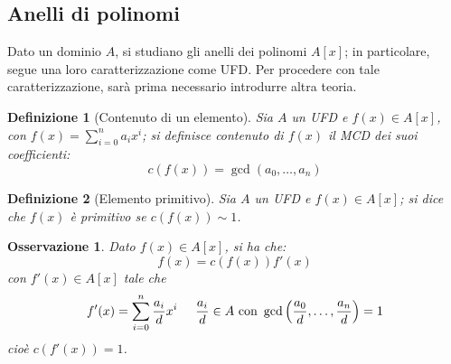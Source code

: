 \documentclass[12pt]{scrartcl}
\theoremstyle{style}
\newtheorem{definizione}{Definizione}[section]
\newtheorem{osservazione}{Osservazione}[section]
\numberwithin{equation}{subsection}
\begin{document}
\subsection{Anelli di polinomi}
Dato un dominio $A$, si studiano gli anelli dei polinomi $A[x]$; in particolare, segue una loro caratterizzazione come UFD.
Per procedere con tale caratterizzazione, sar\`a prima necessario introdurre altra teoria.
\begin{definizione}
	[Contenuto di un elemento]
	Sia $A$ un UFD e $f(x) \in A[x]$, con $f(x) = \sum_{i=0}^{n} a_ix^i$; si definisce \textit{contenuto} di $f(x)$ il MCD dei suoi coefficienti:
	\[
	c(f(x))=\operatorname{gcd}(a_0,\ldots,a_n) 
	\] 
\end{definizione}
\begin{definizione}
	[Elemento primitivo]
	Sia $A$ un UFD e $f(x) \in A[x]$; si dice che $f(x)$ \`e \textit{primitivo} se $c(f(x)) \sim 1$.
\end{definizione}
\begin{osservazione}
	Dato $f(x) \in A[x]$, si ha che:
	\[
	f(x) = c(f(x)) f'(x)
	\] 
	con $f'(x) \in A[x]$ tale che 
\[
f'(x) = \sum_{i=0}^{n} \frac{a_i}{d}x^i \hspace{.5cm} \frac{a_i}{d} \in A \text{ con } \operatorname{gcd}\left(\frac{a_0}{d},\ldots, \frac{a_n}{d}\right) = 1
\] 
	cio\`e $c(f'(x)) = 1$.
\end{osservazione}
\end{document}
